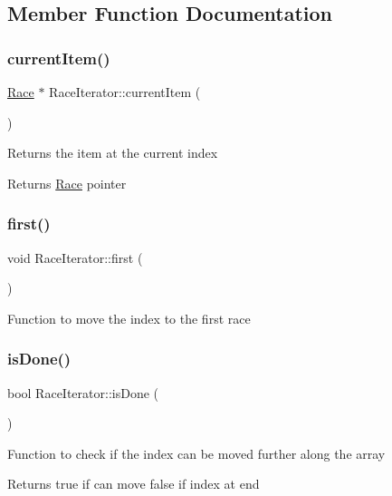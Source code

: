 \subsection{Member Function Documentation}
\mbox{\label{classRaceIterator_adceb8655316b9b0ca00dbe4494ece887}} 
\subsubsection{\texorpdfstring{current\+Item()}{currentItem()}}
{\footnotesize\ttfamily \hyperlink{classRace}{Race} $\ast$ Race\+Iterator\+::current\+Item (\begin{DoxyParamCaption}{ }\end{DoxyParamCaption})}

Returns the item at the current index \begin{DoxyReturn}{Returns}
\hyperlink{classRace}{Race} pointer 
\end{DoxyReturn}
\mbox{\label{classRaceIterator_abfb9e2f16da89b19285414181d6bc7c0}} 
\subsubsection{\texorpdfstring{first()}{first()}}
{\footnotesize\ttfamily void Race\+Iterator\+::first (\begin{DoxyParamCaption}{ }\end{DoxyParamCaption})}

Function to move the index to the first race \mbox{\label{classRaceIterator_a406ce41eae09904a94502f80344f537d}} 
\subsubsection{\texorpdfstring{is\+Done()}{isDone()}}
{\footnotesize\ttfamily bool Race\+Iterator\+::is\+Done (\begin{DoxyParamCaption}{ }\end{DoxyParamCaption})}

Function to check if the index can be moved further along the array \begin{DoxyReturn}{Returns}
true if can move false if index at end 
\end{DoxyReturn}
\mbox{\label{classRaceIterator_ae2a022fadedd9f0c51f9b3f8f994985f}} 
